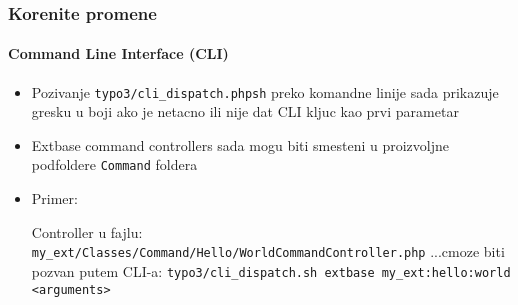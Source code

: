 \begin{frame}[fragile]
	\frametitle{Korenite promene}
	\framesubtitle{Command Line Interface (CLI)}

	\lstset{basicstyle=\tiny\ttfamily}

	\begin{itemize}

		\item Pozivanje \texttt{typo3/cli\_dispatch.phpsh} preko komandne linije sada prikazuje gresku u boji ako je 
			netacno ili nije dat CLI kljuc kao prvi parametar 

		\item Extbase command controllers sada mogu biti smesteni u proizvoljne podfoldere
			\texttt{Command} foldera

		\item Primer:\newline

			Controller u fajlu:\newline
			\smaller\texttt{my\_ext/Classes/Command/Hello/WorldCommandController.php}\normalsize\newline
			...cmoze biti pozvan putem CLI-a:\newline
			\smaller\texttt{typo3/cli\_dispatch.sh extbase my\_ext:hello:world <arguments>}\normalsize

	\end{itemize}

\end{frame}


